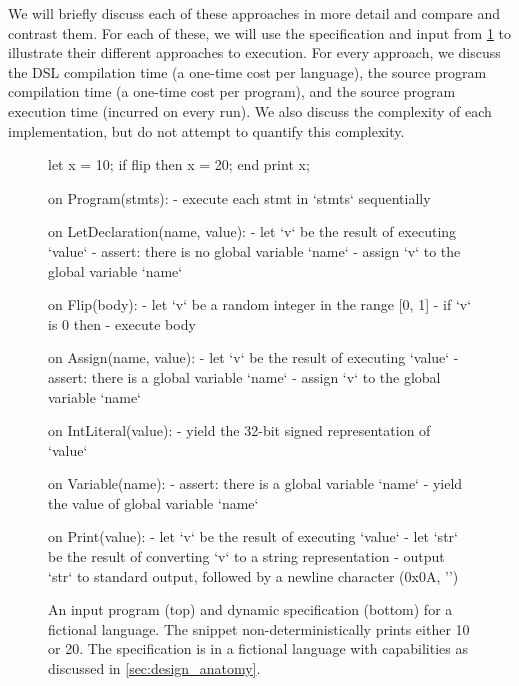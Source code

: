 We will briefly discuss each of these approaches in more detail and compare and contrast them. For each of these, we will use the specification and input from \cref{fig:evaluation_example} to illustrate their different approaches to execution. For every approach, we discuss the \ac{DSL} compilation time (a one-time cost per language), the source program compilation time (a one-time cost per program), and the source program execution time (incurred on every run). We also discuss the complexity of each implementation, but do not attempt to quantify this complexity. 

\begin{figure}
  \begin{plain}
let x = 10;
if flip then
  x = 20;
end
print x;
  \end{plain}
  \begin{plain}
on Program(stmts):
  - execute each stmt in `stmts` sequentially

on LetDeclaration(name, value):
  - let `v` be the result of executing `value`
  - assert: there is no global variable `name`
  - assign `v` to the global variable `name`

on Flip(body):
  - let `v` be a random integer in the range [0, 1]
  - if `v` is 0 then
    - execute body

on Assign(name, value):
  - let `v` be the result of executing `value`
  - assert: there is a global variable `name`
  - assign `v` to the global variable `name`

on IntLiteral(value):
  - yield the 32-bit signed representation of `value`

on Variable(name):
  - assert: there is a global variable `name`
  - yield the value of global variable `name`

on Print(value):
  - let `v` be the result of executing `value`
  - let `str` be the result of converting `v` to a string representation
  - output `str` to standard output, followed by a newline character (0x0A, '\n')
  \end{plain}
  \caption{An input program (top) and dynamic specification (bottom) for a fictional language. The snippet non-deterministically prints either 10 or 20. The specification is in a fictional language with capabilities as discussed in \cref{sec:design_anatomy}.}
  \label{fig:evaluation_example}
\end{figure}

